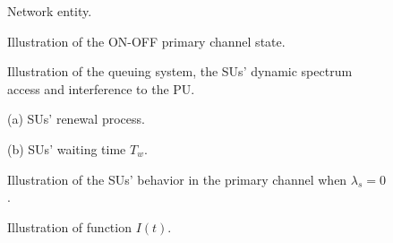 \documentclass[11pt,draftcls]{IEEEtran}{\onecolumn}
\begin{document}
{\renewcommand\baselinestretch{1.13}\selectfont



\par}


















\newpage
\begin{figure}[!h]
  \centerline{}
  \caption{Network entity.}\label{fig1}
\end{figure}

\begin{figure}[!h]
  \centerline{}
  \caption{Illustration of the ON-OFF primary channel state.}\label{fig2}
\end{figure}

\begin{figure}[!h]
\centering
  \caption{Illustration of the queuing system, the SUs' dynamic spectrum access and interference to the PU.}\label{fig3}
\end{figure}

\begin{figure}[!h]
\begin{minipage}[t]{.55\linewidth}
  \centering
  \centerline{}
  \vspace{-0.3cm}
  \centerline{\scriptsize{(a) SUs' renewal process.}}
\end{minipage}
\hfill
\begin{minipage}[t]{0.45\linewidth}
  \centering
  \centerline{}
  \vspace{-0.3cm}
  \centerline{\scriptsize{(b) SUs' waiting time $T_w$.}}
  \medskip
\end{minipage}
\caption{Illustration of the SUs' behavior in the primary channel
when $\lambda_s= 0$.}\label{fig4}
\end{figure}

\begin{figure}[!h]
  \centerline{}\vspace{-0.5cm}
  \caption{Illustration of function $I(t)$.}\label{fig6}
\end{figure}
\end{document}
